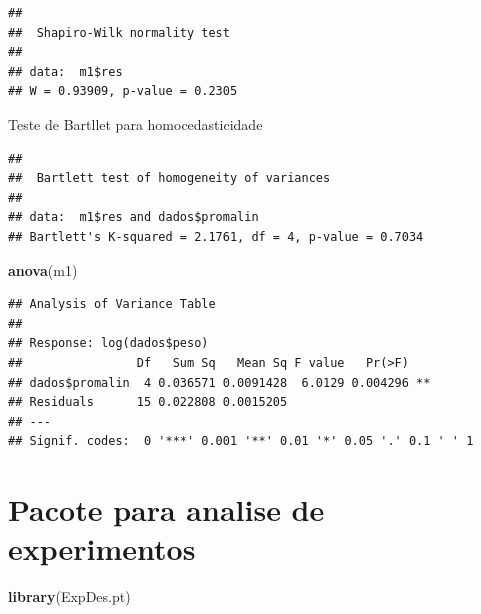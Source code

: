 \documentclass[
]{book}
\newenvironment{Shaded}{\begin{snugshade}}{\end{snugshade}}
\newcommand{\KeywordTok}[1]{\textcolor[rgb]{0.13,0.29,0.53}{\textbf{#1}}}
\newcommand{\NormalTok}[1]{#1}
\newcommand{\OperatorTok}[1]{\textcolor[rgb]{0.81,0.36,0.00}{\textbf{#1}}}
\begin{document}
\begin{Shaded}
\end{Shaded}

\begin{verbatim}
## 
##  Shapiro-Wilk normality test
## 
## data:  m1$res
## W = 0.93909, p-value = 0.2305
\end{verbatim}

Teste de Bartllet para homocedasticidade

\begin{Shaded}
\end{Shaded}

\begin{verbatim}
## 
##  Bartlett test of homogeneity of variances
## 
## data:  m1$res and dados$promalin
## Bartlett's K-squared = 2.1761, df = 4, p-value = 0.7034
\end{verbatim}

\begin{Shaded}
\begin{Highlighting}[]
\KeywordTok{anova}\NormalTok{(m1)}
\end{Highlighting}
\end{Shaded}

\begin{verbatim}
## Analysis of Variance Table
## 
## Response: log(dados$peso)
##                Df   Sum Sq   Mean Sq F value   Pr(>F)   
## dados$promalin  4 0.036571 0.0091428  6.0129 0.004296 **
## Residuals      15 0.022808 0.0015205                    
## ---
## Signif. codes:  0 '***' 0.001 '**' 0.01 '*' 0.05 '.' 0.1 ' ' 1
\end{verbatim}

\hypertarget{pacote-para-analise-de-experimentos}{%
\section{Pacote para analise de experimentos}\label{pacote-para-analise-de-experimentos}}

\begin{Shaded}
\begin{Highlighting}[]
\KeywordTok{library}\NormalTok{(ExpDes.pt)}
\end{Highlighting}
\end{Shaded}
\end{document}
